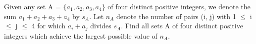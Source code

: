 
\item Given any set A = $\{a_1, a_2, a_3, a_4\}$ of four distinct positive integers, we denote the sum $a_1 + a_2 + a_3 + a_4$ by $s_A$. Let $n_A$ denote the number of pairs (i, j) with 1 $\leq$ i $\leq$ j $\leq$ 4 for which $a_i + a_j$ divides $s_A$. Find all sets A of four distinct positive integers which achieve the largest possible value of $n_A$.
